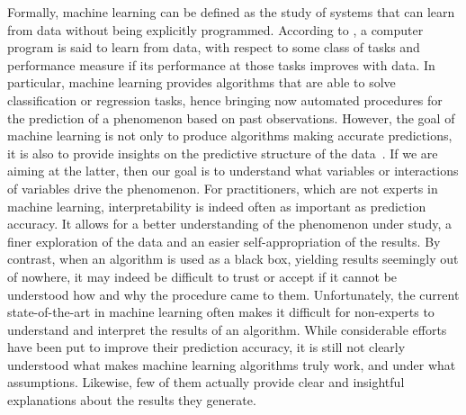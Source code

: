 Formally, machine learning can be defined as the study of systems that can
learn from data without being explicitly programmed. According to
\citet{mitchell:1997}, a computer program is said to learn from data, with
respect to some class of tasks and performance measure if its performance at
those tasks improves with data. In particular, machine learning provides
algorithms that are able to solve classification or regression tasks, hence
bringing now automated procedures for the prediction of a phenomenon based on
past observations. However, the goal of machine learning is not only to produce
algorithms making accurate predictions, it is also to provide insights on the
predictive structure of the data~\citep{breiman:1984}. If we are aiming at the
latter, then our goal is to understand what variables or interactions of
variables drive the phenomenon. For practitioners, which are not experts in
machine learning, interpretability is indeed often as important as prediction
accuracy. It allows for a better understanding of the phenomenon under study, a
finer exploration of the data and an easier self-appropriation of the results.
By contrast, when an algorithm is used as a black box, yielding results
seemingly out of nowhere, it may indeed be difficult to trust or accept if it
cannot be understood how and why the procedure came to them. Unfortunately, the
current state-of-the-art in machine learning often makes it difficult for
non-experts to understand and interpret the results of an algorithm. While
considerable efforts have been put to improve their prediction accuracy, it is
still not clearly understood what makes machine learning algorithms truly work,
and under what assumptions. Likewise, few of them actually provide clear and
insightful explanations about the results they generate.

